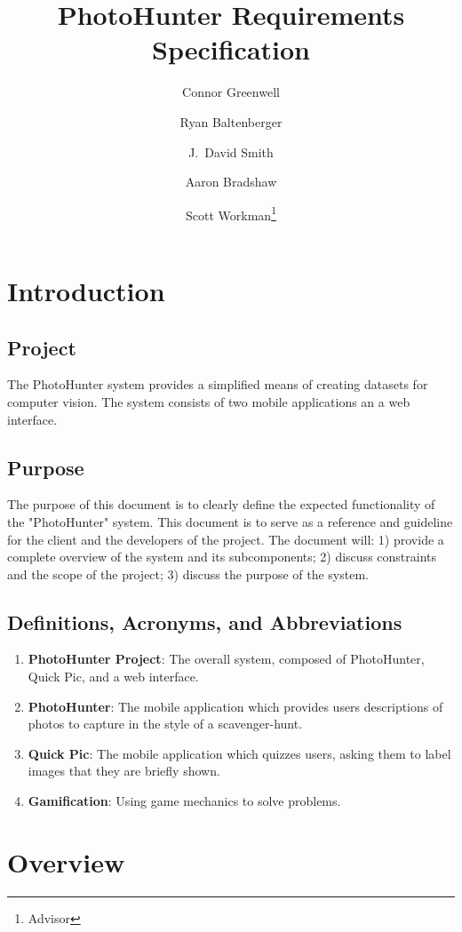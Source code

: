 \documentclass{article}
\title{PhotoHunter Requirements Specification
}
\author{Connor Greenwell \and Ryan Baltenberger 
  \and J.\ David Smith \and Aaron Bradshaw
  \and Scott Workman\footnote{Advisor}}
\begin{document}
\maketitle

\section{Introduction}
\subsection{Project}
The PhotoHunter system provides a simplified means of creating datasets for
computer vision. The system consists of two mobile applications an a web
interface. 

\subsection{Purpose}
The purpose of this document is to clearly define the expected functionality of
the "PhotoHunter" system. This document is to serve as a reference and
guideline for the client and the developers of the project. The document will:
1) provide a complete overview of the system and its subcomponents; 2) discuss
constraints and the scope of the project; 3) discuss the purpose of the system. 

\subsection{Definitions, Acronyms, and Abbreviations}

\begin{enumerate}

  \item \textbf{PhotoHunter Project}: The overall system, composed of PhotoHunter,
        Quick Pic, and a web interface.
  \item \textbf{PhotoHunter}: The mobile application which provides users
        descriptions of photos to capture in the style of a scavenger-hunt. 
  \item \textbf{Quick Pic}: The mobile application which quizzes users, asking
        them to label images that they are briefly shown.
  \item \textbf{Gamification}: Using game mechanics to solve problems.

\end{enumerate}

\section{Overview}
\end{document}
